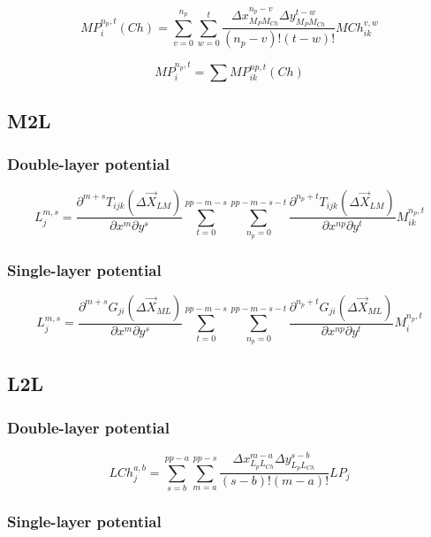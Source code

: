 \documentclass[letter,10pt]{article}
\begin{document}
\begin{equation}
MP_{i}^{n_p,t}(Ch) = \sum_{v=0}^{n_p}\sum_{w=0}^{t}\frac{\Delta x_{M_PM_{Ch}}^{n_p-v} \Delta y_{M_PM_{Ch}}^{t-w}}{(n_p-v)!(t-w)!}MCh_{ik}^{v,w}
\end{equation}

$$MP_{i}^{n_p,t}=\sum MP_{ik}^{np,t}(Ch)$$

\subsection{M2L}

\subsubsection{Double-layer potential}

\begin{equation}
L_j^{m,s} = \frac{\partial^{m+s}T_{ijk}(\Delta\vec{X}_{LM})}{\partial x^m \partial y^s} \sum_{t=0}^{pp-m-s}\sum_{n_p=0}^{pp-m-s-t} \frac{\partial^{n_p+t}T_{ijk}(\Delta\vec{X}_{LM})}{\partial x^{np} \partial y^t} M_{ik}^{n_p,t}
\end{equation}

\subsubsection{Single-layer potential}

\begin{equation}
L_j^{m,s} = \frac{\partial^{m+s}G_{ji}(\Delta\vec{X}_{ML})}{\partial x^m \partial y^s} \sum_{t=0}^{pp-m-s}\sum_{n_p=0}^{pp-m-s-t} \frac{\partial^{n_p+t}G_{ji}(\Delta\vec{X}_{ML})}{\partial x^{np} \partial y^t} M_{i}^{n_p,t}
\end{equation}

\subsection{L2L}

\subsubsection{Double-layer potential}

\begin{equation}
LCh_j^{a,b}=\sum_{s=b}^{pp-a}\sum_{m=a}^{pp-s}\frac{\Delta x_{L_pL_{Ch}}^{m-a}\Delta y_{L_pL_{Ch}}^{s-b}}{(s-b)!(m-a)!}LP_j
\end{equation}

\subsubsection{Single-layer potential}
\end{document}

